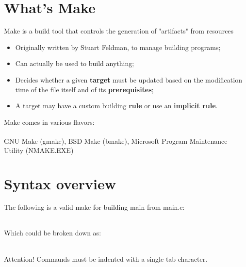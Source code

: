 \section{What's Make}

\begin{frame}{\secname}
    Make is a build tool that controls the generation of "artifacts" from resources

    \begin{itemize}
        \item Originally written by Stuart Feldman, to manage building programs;
        \item Can actually be used to build anything;
        \item Decides whether a given \textbf{target} must be updated based on the modification time of the file itself and of its \textbf{prerequisites};
        \item A target may have a custom building \textbf{rule} or use an \textbf{implicit rule}.
    \end{itemize}

    Make comes in various flavors: \\~\\

    GNU Make (gmake), BSD Make (bmake), Microsoft Program Maintenance Utility (NMAKE.EXE)
\end{frame}



\section{Syntax overview}
\begin{frame}{\secname}
    The following is a valid make for building main from main.c: \\~\\

    \makeMain

    Which could be broken down as: \\~\\

    \makeSyntax

    \begin{alertblock}{Attention!}
        Commands must be indented with a single tab character.
    \end{alertblock}
\end{frame}

